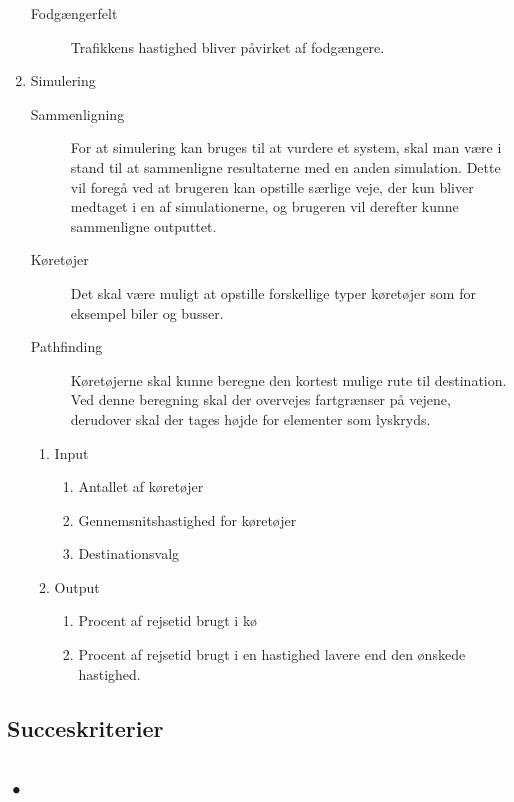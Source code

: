 \begin{enumerate}
\begin{description}
	\item [Fodgængerfelt] Trafikkens hastighed bliver påvirket af fodgængere.
	\end{description}
\item Simulering
    \begin{description}
    \item [Sammenligning] For at simulering kan bruges til at vurdere et system, skal man være i stand til at sammenligne resultaterne med en anden simulation. Dette vil foregå ved at brugeren kan opstille særlige veje, der kun bliver medtaget i en af simulationerne, og brugeren vil derefter kunne sammenligne outputtet.
    \item [Køretøjer] Det skal være muligt at opstille forskellige typer køretøjer som for eksempel biler og busser.
    \item [Pathfinding] Køretøjerne skal kunne beregne den kortest mulige rute til destination. Ved denne beregning skal der overvejes fartgrænser på vejene, derudover skal der tages højde for elementer som lyskryds.
    \end{description}
    \begin{enumerate}
    \item Input
        \begin{enumerate}
        \item Antallet af køretøjer
        \item Gennemsnitshastighed for køretøjer
        \item Destinationsvalg
        \end{enumerate}
    \item Output
        \begin{enumerate}
        \item Procent af rejsetid brugt i kø
        \item Procent af rejsetid brugt i en hastighed lavere end den ønskede hastighed.
        \end{enumerate}
    \end{enumerate}
\end{enumerate}

\subsection{Succeskriterier}\label{Succeskriterier}

\subsection{•}
